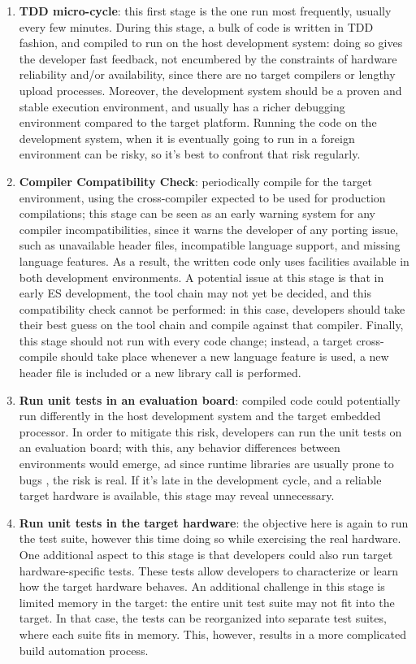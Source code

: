 \begin{enumerate}
    \item \textbf{TDD micro-cycle}: this first stage is the one run most frequently, usually every few minutes. During this stage, a bulk of code is written in TDD fashion, and compiled to run on the host development system: doing so gives the developer fast feedback, not encumbered by the constraints of hardware reliability and/or availability, since there are no target compilers or lengthy upload processes. Moreover, the development system should be a proven and stable execution environment, and usually has a richer debugging environment compared to the target platform. 
    Running the code on the development system, when it is eventually going to run in a foreign environment can be risky, so it's best to confront that risk regularly.
    \item \textbf{Compiler Compatibility Check}: periodically compile for the target environment, using the cross-compiler expected to be used for production compilations; this stage can be seen as an early warning system for any compiler incompatibilities, since it warns the developer of any porting issue, such as unavailable header files, incompatible language support, and missing language features. As a result, the written code only uses facilities available in both development environments.
    A potential issue at this stage is that in early ES development, the tool chain may not yet be decided, and this compatibility check cannot be performed: in this case, developers should take their best guess on the tool chain and compile against that compiler.
    Finally, this stage should not run with every code change; instead, a target cross-compile should take place whenever a new language feature is used, a new header file is included or a new library call is performed.
    \item \textbf{Run unit tests in an evaluation board}: compiled code could potentially run differently in the host development system and the target embedded processor. In order to mitigate this risk, developers can run the unit tests on an evaluation board; with this, any behavior differences between environments would emerge, ad since runtime libraries are usually prone to bugs \cite{TDDEC}, the risk is real. If it's late in the development cycle, and a reliable target hardware is available, this stage may reveal unnecessary.
    \item \textbf{Run unit tests in the target hardware}: the objective here is again to run the test suite, however this time doing so while exercising the real hardware. One additional aspect to this stage is that developers could also run target hardware-specific tests. These tests allow developers to characterize or learn how the target hardware behaves. An additional challenge in this stage is limited memory in the target: the entire unit test suite may not fit into the target. In that case, the tests can be reorganized into separate test suites, where each suite fits in memory. This, however, results in a more complicated build automation process.

\end{enumerate}
